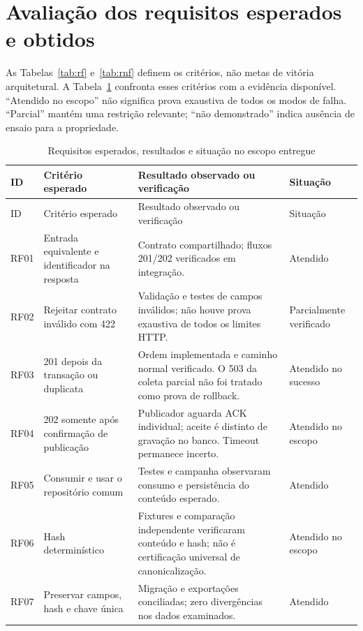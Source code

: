 \section{Avaliação dos requisitos esperados e obtidos}
As Tabelas~\ref{tab:rf} e~\ref{tab:rnf} definem os critérios, não metas de vitória arquitetural. A Tabela~\ref{tab:requisitos-obtidos} confronta esses critérios com a evidência disponível. ``Atendido no escopo'' não significa prova exaustiva de todos os modos de falha. ``Parcial'' mantém uma restrição relevante; ``não demonstrado'' indica ausência de ensaio para a propriedade.

{\small
\setlength{\tabcolsep}{4pt}
\begin{longtable}{p{}p{}p{}p{}}
\caption{Requisitos esperados, resultados e situação no escopo entregue}\label{tab:requisitos-obtidos}\\
\hline ID & Critério esperado & Resultado observado ou verificação & Situação\\ \hline
\endfirsthead
\hline ID & Critério esperado & Resultado observado ou verificação & Situação\\ \hline
\endhead
RF01 & Entrada equivalente e identificador na resposta & Contrato compartilhado; fluxos 201/202 verificados em integração. & Atendido\\ \hline
RF02 & Rejeitar contrato inválido com 422 & Validação e testes de campos inválidos; não houve prova exaustiva de todos os limites HTTP. & Parcialmente verificado\\ \hline
RF03 & 201 depois da transação ou duplicata & Ordem implementada e caminho normal verificado. O 503 da coleta parcial não foi tratado como prova de rollback. & Atendido no sucesso\\ \hline
RF04 & 202 somente após confirmação de publicação & Publicador aguarda ACK individual; aceite é distinto de gravação no banco. Timeout permanece incerto. & Atendido no escopo\\ \hline
RF05 & Consumir e usar o repositório comum & Testes e campanha observaram consumo e persistência do conteúdo esperado. & Atendido\\ \hline
RF06 & Hash determinístico & Fixtures e comparação independente verificaram conteúdo e hash; não é certificação universal de canonicalização. & Atendido no escopo\\ \hline
RF07 & Preservar campos, hash e chave única & Migração e exportações conciliadas; zero divergências nos dados examinados. & Atendido\\ \hline

\end{longtable}}
